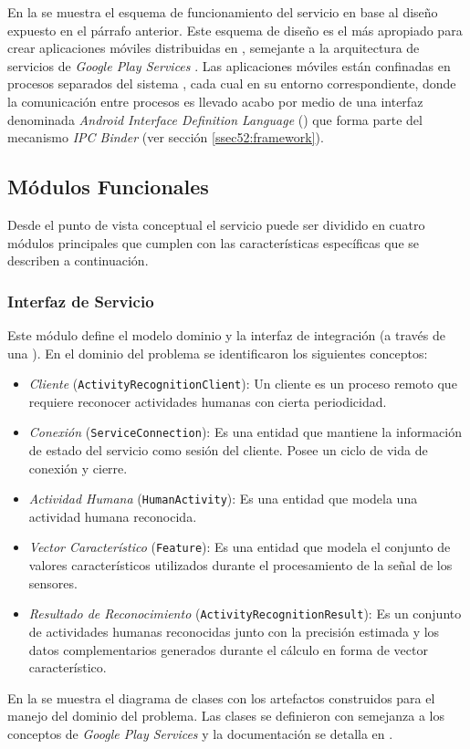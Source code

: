 En la  se muestra el esquema de funcionamiento
del servicio \emph{} en base al diseño expuesto en
el párrafo anterior. Este esquema de diseño es el más apropiado para
crear aplicaciones móviles distribuidas en \emph{},
semejante a la arquitectura de servicios de \emph{Google Play Services}
\cite{Google2016l}. Las aplicaciones móviles están confinadas en
procesos separados del sistema \emph{}, cada cual en
su entorno  correspondiente, donde la comunicación entre
procesos es llevado acabo por medio de una interfaz denominada \emph{Android
Interface Definition Language} () que forma parte del
mecanismo \emph{IPC Binder} (ver sección \ref{ssec52:framework}).

\subsection{Módulos Funcionales}

\label{ssec54:modulos}Desde el punto de vista conceptual el servicio
\emph{} puede ser dividido en cuatro módulos principales
que cumplen con las características específicas que se describen a
continuación.

\subsubsection{Interfaz de Servicio}

Este módulo define el modelo dominio y la interfaz de integración
(a través de una ). En el dominio del problema se identificaron
los siguientes conceptos:
\begin{itemize}
\item \emph{Cliente} (\texttt{\small{}ActivityRecognitionClient}): Un cliente
es un proceso remoto que requiere reconocer actividades humanas con
cierta periodicidad.
\item \emph{Conexión} (\texttt{\small{}ServiceConnection}):\emph{ }Es una
entidad que mantiene la información de estado del servicio como sesión
del cliente. Posee un ciclo de vida de conexión y cierre.
\item \emph{Actividad Humana} (\texttt{\small{}HumanActivity}): Es una entidad
que modela una actividad humana reconocida.
\item \emph{Vector Característico} (\texttt{\small{}Feature}): Es una entidad
que modela el conjunto de valores característicos utilizados durante
el procesamiento de la señal de los sensores.
\item \emph{Resultado de Reconocimiento} (\texttt{\small{}ActivityRecognitionResult}):
Es un conjunto de actividades humanas reconocidas junto con la precisión
estimada y los datos complementarios generados durante el cálculo
en forma de vector característico.
\end{itemize}
En la  se muestra el diagrama de clases
con los artefactos construidos para el manejo del dominio del problema.
Las clases se definieron con semejanza a los conceptos de \emph{Google
Play Services} \cite{Google2016l} y la documentación se detalla en
\cite{GimenezYegros2016d}.

